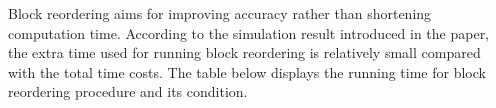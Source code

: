 Block reordering aims for improving accuracy rather than shortening computation time. According to the simulation result introduced in the paper, the extra time used for running block reordering is relatively small compared with the total time costs. The table below displays the running time for block reordering procedure and its condition.\\
